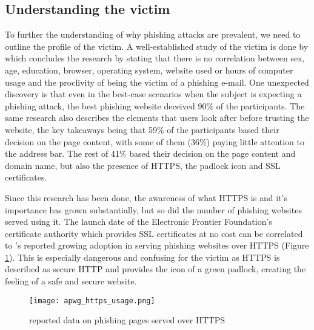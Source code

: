 \subsection{Understanding the victim}
To further the understanding of why phishing attacks are prevalent, we need to outline the profile of the victim. A well-established study of the victim is done by \cite{WHY_PHISHING_WORKS} which concludes the research by stating that there is no correlation between sex, age, education, browser, operating system, website used or hours of computer usage and the proclivity of being the victim of a phishing e-mail. One unexpected discovery is that even in the best-case scenarios when the subject is expecting a phishing attack, the best phishing website deceived 90\% of the participants. The same research also describes the elements that users look after before trusting the website, the key takeaways being that 59\% of the participants based their decision on the page content, with some of them (36\%) paying little attention to the address bar. The rest of 41\% based their decision on the page content and domain name, but also the presence of HTTPS, the padlock icon and SSL certificates.

Since this research has been done, the awareness of what HTTPS is and it's importance has grown substantially, but so did the number of phishing websites served using it. The launch date of the Electronic Frontier Foundation's \citep{EFF_LETS_ENCRYPT} certificate authority which provides SSL certificates at no cost can be correlated to \cite{APWG_Q42019}'s reported growing adoption in serving phishing websites over HTTPS (Figure \ref{fig:HTTPS_USAGE}). This is especially dangerous and confusing for the victim as HTTPS is described as secure HTTP and provides the icon of a green padlock, creating the feeling of a safe and secure website.

\begin{figure}[t]
	\centering
	\texttt{[image: apwg\_https\_usage.png]}
	\caption{\cite{APWG_Q42019} reported data on phishing pages served over HTTPS}
	\label{fig:HTTPS_USAGE}
\end{figure}

